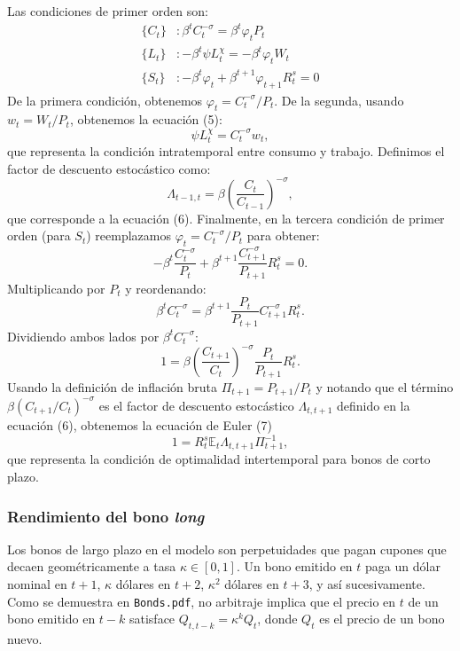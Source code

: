 \documentclass[../../entrega.tex]{subfiles}
\begin{document}
Las condiciones de primer orden son:
\begin{align*}
    \{C_t\} & : \beta^t C_t^{-\sigma} = \beta^t \varphi_t P_t            \\
    \{L_t\} & : -\beta^t \psi L_t^\chi = -\beta^t \varphi_t W_t          \\
    \{S_t\} & : -\beta^t \varphi_t + \beta^{t+1} \varphi_{t+1} R_t^s = 0
\end{align*}
De la primera condición, obtenemos $\varphi_t = C_t^{-\sigma}/P_t$.
De la segunda, usando $w_t = W_t/P_t$, obtenemos la ecuación (5):
\begin{equation}
    \psi L_t^\chi = C_t^{-\sigma} w_t,
\end{equation}
que representa la condición intratemporal entre consumo y trabajo.
Definimos el factor de descuento estocástico como:
\begin{equation}
    \Lambda_{t-1,t} = \beta\left(\frac{C_t}{C_{t-1}}\right)^{-\sigma},
\end{equation}
que corresponde a la ecuación (6).
Finalmente, en la tercera condición de primer orden (para $S_t$) reemplazamos $\varphi_t = C_t^{-\sigma}/P_t$ para obtener:
\begin{equation*}
    -\beta^t \frac{C_t^{-\sigma}}{P_t} + \beta^{t+1} \frac{C_{t+1}^{-\sigma}}{P_{t+1}} R_t^s = 0.
\end{equation*}
Multiplicando por $P_t$ y reordenando:
\begin{equation*}
    \beta^t C_t^{-\sigma} = \beta^{t+1} \frac{P_t}{P_{t+1}} C_{t+1}^{-\sigma} R_t^s.
\end{equation*}
Dividiendo ambos lados por $\beta^t C_t^{-\sigma}$:
\begin{equation*}
    1 = \beta \left(\frac{C_{t+1}}{C_t}\right)^{-\sigma} \frac{P_t}{P_{t+1}} R_t^s.
\end{equation*}
Usando la definición de inflación bruta $\Pi_{t+1} = P_{t+1}/P_t$ y notando que el término $\beta(C_{t+1}/C_t)^{-\sigma}$ es el factor de descuento estocástico $\Lambda_{t,t+1}$ definido en la ecuación (6), obtenemos la ecuación de Euler (7)
\begin{equation}
    1 = R_t^s \mathbb{E}_t \Lambda_{t,t+1} \Pi_{t+1}^{-1},
\end{equation}
que representa la condición de optimalidad intertemporal para bonos de corto plazo.

\subsubsection{Rendimiento del bono \emph{long}}
Los bonos de largo plazo en el modelo son perpetuidades que pagan cupones que decaen geométricamente a tasa $\kappa \in [0,1]$.
Un bono emitido en $t$ paga un dólar nominal en $t+1$, $\kappa$ dólares en $t+2$, $\kappa^2$ dólares en $t+3$, y así sucesivamente.
Como se demuestra en \texttt{Bonds.pdf}, no arbitraje implica que el precio en $t$ de un bono emitido en $t-k$ satisface $Q_{t,t-k} = \kappa^k Q_t$, donde $Q_t$ es el precio de un bono nuevo.
\end{document}
